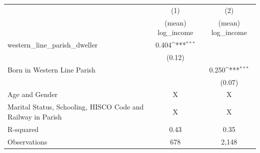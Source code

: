 {
\def\sym#1{\ifmmode^{#1}\else\(^{#1}\)\fi}
\begin{tabular}{l*{2}{c}}
\hline\hline
                    &\multicolumn{1}{c}{(1)}&\multicolumn{1}{c}{(2)}\\
                    &\multicolumn{1}{c}{(mean) log\_income}&\multicolumn{1}{c}{(mean) log\_income}\\
\hline
western\_line\_parish\_dweller&       0.404\sym{***}&                     \\
                    &      (0.12)         &                     \\
Born in Western Line Parish&                     &       0.250\sym{***}\\
                    &                     &      (0.07)         \\
\hline
Age and Gender      &           X         &           X         \\
Marital Status, Schooling, HISCO Code and Railway in Parish&           X         &           X         \\
R-squared           &        0.43         &        0.35         \\
Observations        &         678         &       2,148         \\
\hline\hline
\end{tabular}
}
